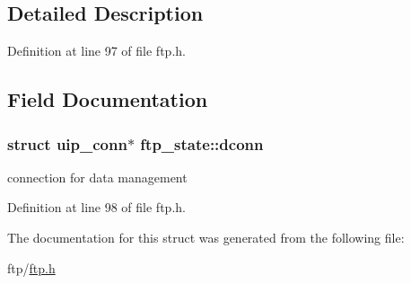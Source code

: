 \subsection{Detailed Description}


Definition at line 97 of file ftp.h.



\subsection{Field Documentation}
\hypertarget{structftp__state_aa78fbc165cc68a2797d9b38448ebe101}{
\subsubsection[{dconn}]{\setlength{\rightskip}{0pt plus 5cm}struct {\bf uip\_\-conn}$\ast$ {\bf ftp\_\-state::dconn}}}
\label{structftp__state_aa78fbc165cc68a2797d9b38448ebe101}
connection for data management 

Definition at line 98 of file ftp.h.



The documentation for this struct was generated from the following file:\begin{DoxyCompactItemize}
\item 
ftp/\hyperlink{ftp_8h}{ftp.h}\end{DoxyCompactItemize}
